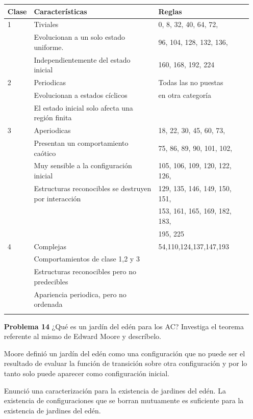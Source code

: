 \documentclass{article}
\begin{document}
\begin{enumerate}
\begin{tabular}{|l|l|l|l|}  
  \hline
 Clase &  Características & Reglas\\
  \hline
1 & Tiviales          & 0, 8, 32, 40, 64, 72,\\
  & Evolucionan a un solo estado uniforme.                  & 96, 104, 128, 132, 136,\\
  & Independientemente del estado inicial                  & 160, 168, 192, 224\\
\hline
2 & Periodicas & Todas las no puestas \\
  & Evolucionan a estados cíclicos           &    en otra categoría \\
  & El estado inicial solo afecta una región finita & \\
\hline
3 & Aperiodicas & 18, 22, 30, 45, 60, 73,\\
  & Presentan un comportamiento caótico  & 75, 86, 89, 90, 101, 102,\\
  & Muy sensible a la configuración inicial            & 105, 106, 109, 120, 122, 126,\\
  & Estructuras reconocibles se destruyen por interacción           & 129, 135, 146, 149, 150, 151,\\
  &             & 153, 161, 165, 169, 182, 183,\\
  &             & 195, 225\\
\hline
4 & Complejas & 54,110,124,137,147,193\\ 
 & Comportamientos de clase 1,2 y 3 & \\
 & Estructuras reconocibles pero no predecibles & \\
 & Apariencia periodica, pero no ordenada& \\
 & & \\
  \hline
\end{tabular}


\item[\bf{Problema 14}] ¿Qué es un jardín del edén para los AC? Investiga el teorema referente al mismo de Edward Moore y descríbelo.

Moore \cite{Moore1962} definió un jardín del edén como una configuración que no puede ser el resultado de evaluar la función de transición sobre otra configuración y por lo tanto solo puede aparecer como configuración inicial.

Enunció una caracterización para la existencia de jardines del edén.
La existencia de configuraciones que se borran mutuamente es suficiente para la existencia de jardines del edén.


\end{enumerate}
\end{document}
